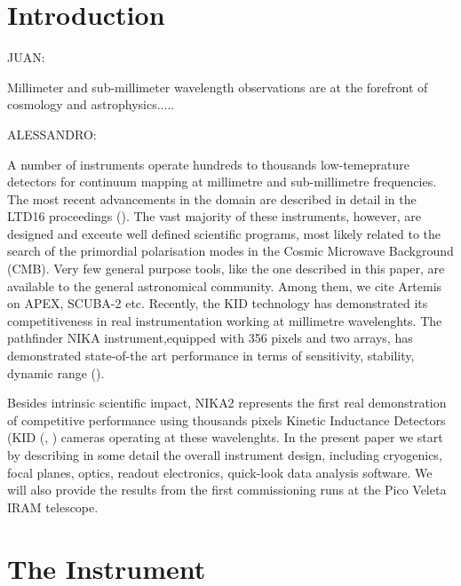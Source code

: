 \documentclass[]{aa} %
\begin{document}
   \maketitle
%

\section{Introduction}

JUAN:

Millimeter and sub-millimeter wavelength observations are at the forefront of cosmology and astrophysics.....  

ALESSANDRO: 

A number of instruments operate hundreds to thousands low-temeprature detectors for continuum mapping at millimetre and sub-millimetre frequencies. The most recent advancements in the domain are described in detail in the LTD16 proceedings (\cite{ltd16:2016}). The vast majority of these instruments, however, are designed and exceute well defined scientific programs, most likely related to the search of the primordial polarisation modes in the Cosmic Microwave Background (CMB). Very few general purpose tools, like the one described in this paper, are available to the general astronomical community. Among them, we cite Artemis on APEX, SCUBA-2 etc. Recently, the KID technology has demonstrated its competitiveness in real instrumentation working at millimetre wavelenghts. The pathfinder NIKA instrument,equipped with 356 pixels and two arrays, has demonstrated state-of-the art performance in terms of sensitivity, stability, dynamic range (\cite{Catalano2014, Monfardini2011, Adam2014}).

Besides intrinsic scientific impact, NIKA2 represents the first real demonstration of competitive performance using thousands pixels Kinetic Inductance Detectors (KID (\cite{Day2003}, \cite{Doyle2010}) cameras operating at these wavelenghts. In the present paper we start by describing in some detail the overall instrument design, including cryogenics, focal planes, optics, readout electronics, quick-look data analysis software. We will also provide the results from the first commissioning runs at the Pico Veleta IRAM telescope. 


\section{The Instrument}
\end{document}
